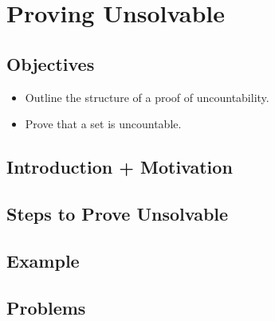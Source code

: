 \chapter{Proving Unsolvable}

\section{Objectives}

\begin{itemize}
	\item Outline the structure of a proof of uncountability.
	\item Prove that a set is uncountable.
\end{itemize}

\section{Introduction + Motivation}

\section{Steps to Prove Unsolvable}
%

\section{Example}

\section{Problems}